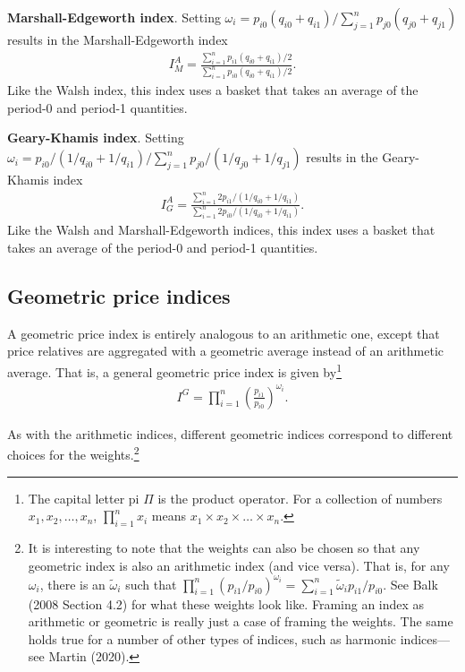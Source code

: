 \documentclass[]{article}
\begin{document}
\textbf{Marshall-Edgeworth index}. Setting \(\omega_{i} = p_{i0} (q_{i0} + q_{i1}) / \sum_{j = 1}^{n} p_{j0} (q_{j0} + q_{j1})\) results in the Marshall-Edgeworth index
\begin{align*}
I^{A}_{M} = \frac{\sum_{i = 1}^{n} p_{i1} (q_{i0} + q_{i1}) / 2}{\sum_{i = 1}^{n} p_{i0} (q_{i0} + q_{i1}) / 2}.
\end{align*}
Like the Walsh index, this index uses a basket that takes an average of the period-0 and period-1 quantities.

\textbf{Geary-Khamis index}. Setting \(\omega_{i} = p_{i0} / (1 / q_{i0} + 1 / q_{i1}) / \sum_{j = 1}^{n} p_{j0} / (1 / q_{j0} + 1 / q_{j1})\) results in the Geary-Khamis index
\begin{align*}
I^{A}_{G} = \frac{\sum_{i = 1}^{n} 2 p_{i1} / (1 / q_{i0} + 1 / q_{i1})}{\sum_{i = 1}^{n} 2 p_{i0} / (1 / q_{i0} + 1 / q_{i1})}.
\end{align*}
Like the Walsh and Marshall-Edgeworth indices, this index uses a basket that takes an average of the period-0 and period-1 quantities.

\hypertarget{geometric-price-indices}{%
\subsection{Geometric price indices}\label{geometric-price-indices}}

A geometric price index is entirely analogous to an arithmetic one, except that price relatives are aggregated with a geometric average instead of an arithmetic average. That is, a general geometric price index is given by\footnote{The capital letter pi \(\Pi\) is the product operator. For a collection of numbers \(x_{1}, x_{2},\ldots,x_{n}\), \(\prod_{i=1}^{n} x_{i}\) means \(x_{1} \times x_{2} \times \ldots \times x_{n}\).}
\begin{align*}
I^{G} = \prod_{i = 1}^{n} \left(\frac{p_{i1}}{p_{i0}}\right)^{\omega_{i}}.
\end{align*}

As with the arithmetic indices, different geometric indices correspond to different choices for the weights.\footnote{It is interesting to note that the weights can also be chosen so that any geometric index is also an arithmetic index (and vice versa). That is, for any \(\omega_{i}\), there is an \(\tilde{\omega}_{i}\) such that \(\prod_{i = 1}^{n} (p_{i1} / p_{i0})^{\omega_{i}} = \sum_{i = 1}^{n} \tilde{\omega}_{i} p_{i1} / p_{i0}\). See Balk (2008 Section 4.2) for what these weights look like. Framing an index as arithmetic or geometric is really just a case of framing the weights. The same holds true for a number of other types of indices, such as harmonic indices---see Martin (2020).}
\end{document}
